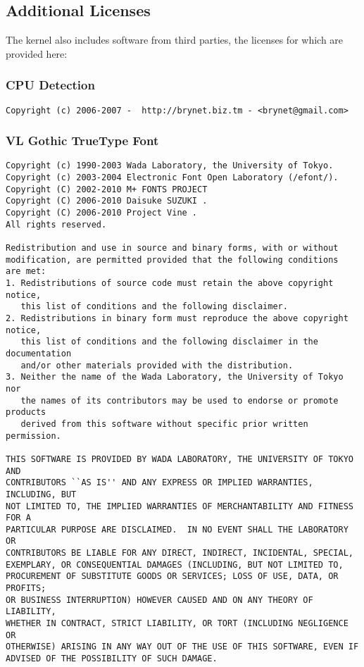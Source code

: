 \subsection{Additional Licenses}

The kernel also includes software from third parties, the licenses for which are provided here: \\

\subsubsection{CPU Detection}
\begin{verbatim}
Copyright (c) 2006-2007 -  http://brynet.biz.tm - <brynet@gmail.com>
\end{verbatim}

\subsubsection{VL Gothic TrueType Font}
\begin{verbatim}
Copyright (c) 1990-2003 Wada Laboratory, the University of Tokyo.
Copyright (c) 2003-2004 Electronic Font Open Laboratory (/efont/).
Copyright (C) 2002-2010 M+ FONTS PROJECT
Copyright (C) 2006-2010 Daisuke SUZUKI .
Copyright (C) 2006-2010 Project Vine .
All rights reserved.

Redistribution and use in source and binary forms, with or without
modification, are permitted provided that the following conditions
are met:
1. Redistributions of source code must retain the above copyright notice,
   this list of conditions and the following disclaimer.
2. Redistributions in binary form must reproduce the above copyright notice,
   this list of conditions and the following disclaimer in the documentation
   and/or other materials provided with the distribution.
3. Neither the name of the Wada Laboratory, the University of Tokyo nor
   the names of its contributors may be used to endorse or promote products
   derived from this software without specific prior written permission.

THIS SOFTWARE IS PROVIDED BY WADA LABORATORY, THE UNIVERSITY OF TOKYO AND
CONTRIBUTORS ``AS IS'' AND ANY EXPRESS OR IMPLIED WARRANTIES, INCLUDING, BUT
NOT LIMITED TO, THE IMPLIED WARRANTIES OF MERCHANTABILITY AND FITNESS FOR A
PARTICULAR PURPOSE ARE DISCLAIMED.  IN NO EVENT SHALL THE LABORATORY OR
CONTRIBUTORS BE LIABLE FOR ANY DIRECT, INDIRECT, INCIDENTAL, SPECIAL,
EXEMPLARY, OR CONSEQUENTIAL DAMAGES (INCLUDING, BUT NOT LIMITED TO,
PROCUREMENT OF SUBSTITUTE GOODS OR SERVICES; LOSS OF USE, DATA, OR PROFITS;
OR BUSINESS INTERRUPTION) HOWEVER CAUSED AND ON ANY THEORY OF LIABILITY,
WHETHER IN CONTRACT, STRICT LIABILITY, OR TORT (INCLUDING NEGLIGENCE OR
OTHERWISE) ARISING IN ANY WAY OUT OF THE USE OF THIS SOFTWARE, EVEN IF
ADVISED OF THE POSSIBILITY OF SUCH DAMAGE.
\end{verbatim}

